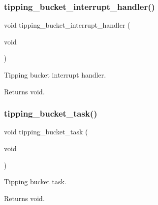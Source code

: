 \subsubsection{\texorpdfstring{tipping\+\_\+bucket\+\_\+interrupt\+\_\+handler()}{tipping\_bucket\_interrupt\_handler()}}
{\footnotesize\ttfamily void tipping\+\_\+bucket\+\_\+interrupt\+\_\+handler (\begin{DoxyParamCaption}\item[{void}]{ }\end{DoxyParamCaption})}



Tipping bucket interrupt handler. 

\begin{DoxyReturn}{Returns}
void. 
\end{DoxyReturn}
\mbox{\label{i2c-rain_8h_a8fcd3e091d63c9caff82b8bc3398c279}} 
\subsubsection{\texorpdfstring{tipping\+\_\+bucket\+\_\+task()}{tipping\_bucket\_task()}}
{\footnotesize\ttfamily void tipping\+\_\+bucket\+\_\+task (\begin{DoxyParamCaption}\item[{void}]{ }\end{DoxyParamCaption})}



Tipping bucket task. 

\begin{DoxyReturn}{Returns}
void. 
\end{DoxyReturn}
